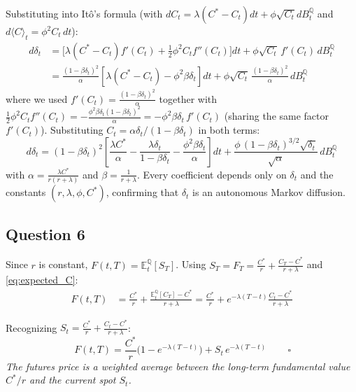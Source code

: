 \documentclass[12pt,a4paper]{article}
\begin{document}
Substituting into Itô's formula (with $dC_t = \lambda(C^* - C_t)dt + \phi\sqrt{C_t}dB^{\mathbb{Q}}_t$ and $d\langle C\rangle_t = \phi^2 C_t\,dt$):
\begin{align*}
    d\delta_t &= \big[\lambda(C^* - C_t)f'(C_t) + \tfrac{1}{2}\phi^2 C_t f''(C_t)\big]dt + \phi\sqrt{C_t}\,f'(C_t)\,dB^{\mathbb{Q}}_t \\
    &= \frac{(1-\beta\delta_t)^2}{\alpha}\!\left[\lambda(C^* - C_t) - \phi^2 \beta \delta_t\right]\!dt + \phi\sqrt{C_t}\,\frac{(1-\beta\delta_t)^2}{\alpha}\,dB^{\mathbb{Q}}_t
\end{align*}
where we used $f'(C_t)=\frac{(1-\beta\delta_t)^2}{\alpha}$ together with $\tfrac{1}{2}\phi^2 C_t f''(C_t) = -\frac{\phi^2\beta\delta_t(1-\beta\delta_t)^2}{\alpha} = -\phi^2\beta\delta_t\,f'(C_t)$ (sharing the same factor $f'(C_t)$). Substituting $C_t = \alpha\delta_t/(1-\beta\delta_t)$ in both terms:
\begin{equation*}
    \boxed{\,d\delta_t = (1-\beta\delta_t)^2\!\left[\frac{\lambda C^*}{\alpha} - \frac{\lambda \delta_t}{1-\beta\delta_t} - \frac{\phi^2 \beta \delta_t}{\alpha}\right]\!dt + \frac{\phi\,(1-\beta\delta_t)^{3/2}\sqrt{\delta_t}}{\sqrt{\alpha}}\,dB^{\mathbb{Q}}_t\,}
\end{equation*}
with $\alpha=\frac{\lambda C^*}{r(r+\lambda)}$ and $\beta=\frac{1}{r+\lambda}$. Every coefficient depends only on $\delta_t$ and the constants $(r,\lambda,\phi,C^*)$, confirming that $\delta_t$ is an autonomous Markov diffusion.
\subsection*{Question 6}

Since $r$ is constant, $F(t,T) = \mathbb{E}^{\mathbb{Q}}_t[S_T]$. Using $S_T = F_T = \frac{C^*}{r} + \frac{C_T - C^*}{r+\lambda}$ and \eqref{eq:expected_C}:
\begin{align*}
    F(t,T) &= \frac{C^*}{r} + \frac{\mathbb{E}^{\mathbb{Q}}_t[C_T] - C^*}{r+\lambda} = \frac{C^*}{r} + e^{-\lambda(T-t)}\frac{C_t - C^*}{r+\lambda}
\end{align*}

Recognizing $S_t = \frac{C^*}{r} + \frac{C_t - C^*}{r+\lambda}$:
\begin{equation*}
    \boxed{\,F(t,T) = \frac{C^*}{r}\big(1 - e^{-\lambda(T-t)}\big) + S_t\,e^{-\lambda(T-t)}\,} \qquad \square
\end{equation*}
\textit{The futures price is a weighted average between the long-term fundamental value $C^*/r$ and the current spot $S_t$.}
\end{document}
